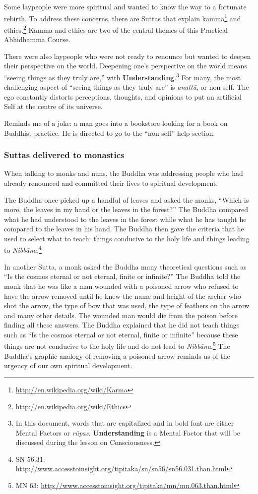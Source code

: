 \pagebreak

Some laypeople were more spiritual and wanted to know the way to a fortunate rebirth. To address these concerns, there are Suttas that explain kamma\footnote{\url{http://en.wikipedia.org/wiki/Karma}} and ethics.\footnote{\url{http://en.wikipedia.org/wiki/Ethics}} Kamma and ethics are two of the central themes of this Practical Abhidhamma Course.

There were also laypeople who were not ready to renounce but wanted to deepen their perspective on the world. Deepening one’s perspective on the world means “seeing things as they truly are,” with \textbf{Understanding}.\footnote{In this document, words that are capitalized and in bold font are either Mental Factors or \textit{rūpas}. \textbf{Understanding} is a Mental Factor that will be discussed during the lesson on Consciousness.} For many, the most challenging aspect of “seeing things as they truly are” is \textit{anattā}, or non-self. The ego constantly distorts perceptions, thoughts, and opinions to put an artificial Self at the centre of its universe. 

Reminds me of a joke: a man goes into a bookstore looking for a book on Buddhist practice. He is directed to go to the “non-self” help section.

\subsubsection*{Suttas delivered to monastics}

When talking to monks and nuns, the Buddha was addressing people who had already renounced and committed their lives to spiritual development.

The Buddha once picked up a handful of leaves and asked the monks, “Which is more, the leaves in my hand or the leaves in the forest?” The Buddha compared what he had understood to the leaves in the forest while what he has taught he compared to the leaves in his hand. The Buddha then gave the criteria that he used to select what to teach: things conducive to the holy life and things leading to \textit{Nibbāna}.\footnote{SN 56.31: \url{http://www.accesstoinsight.org/tipitaka/sn/sn56/sn56.031.than.html}}

In another Sutta, a monk asked the Buddha many theoretical questions such as “Is the cosmos eternal or not eternal, finite or infinite?” The Buddha told the monk that he was like a man wounded with a poisoned arrow who refused to have the arrow removed until he knew the name and height of the archer who shot the arrow, the type of bow that was used, the type of feathers on the arrow and many other details. The wounded man would die from the poison before finding all these answers. The Buddha explained that he did not teach things such as “Is the cosmos eternal or not eternal, finite or infinite” because these things are not conducive to the holy life and do not lead to \textit{Nibbāna}.\footnote{MN 63: \url{http://www.accesstoinsight.org/tipitaka/mn/mn.063.than.html}} The Buddha’s graphic analogy of removing a poisoned arrow reminds us of the urgency of our own spiritual development.


